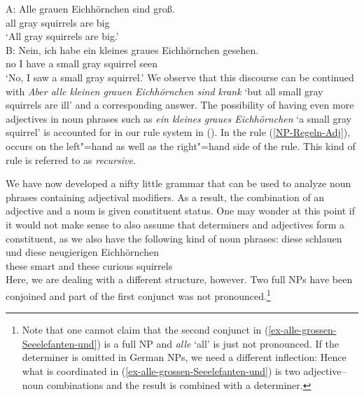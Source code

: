 \ea
\label{Beispiel-Iteration-Adjektive}
\gll A: Alle grauen Eichhörnchen sind groß.\\
\spacebr{} all gray squirrels are big\\
\glt \hphantom{A:~}`All gray squirrels are big.'\\
\gll B: Nein, ich habe ein kleines graues Eichhörnchen gesehen.\\
	\spacebr{} no I have a small gray squirrel seen\\
\glt \hphantom{B:~}`No, I saw a small gray squirrel.'
\z
We observe that this discourse can be continued with \emph{Aber alle kleinen grauen Eichhörnchen
  sind krank} `but all small gray squirrels are ill' and a corresponding answer. The possibility
  of having even more adjectives in noun phrases such as \emph{ein kleines graues Eichhörnchen} `a
  small gray squirrel' is accounted for in our rule system in (). In the rule
  (\ref{NP-Regeln-Adj}), \nbar occurs on the left"=hand as well as the right"=hand 
  side of the rule. This kind of rule is referred to as \emph{recursive}.

\largerpage
We have now developed a nifty little grammar that can be used to analyze noun phrases containing
adjectival modifiers. As a result, the combination of an adjective and a noun is given constituent
status. One may wonder at this point if it would not make sense to also assume that determiners and
adjectives form a constituent, as we also have the following kind of noun phrases: 
\ea
\gll diese schlauen und diese neugierigen Eichhörnchen\\
     these smart    and these curious     squirrels\\
\z
Here, we are dealing with a different structure, however. Two full NPs have been
conjoined and part of the first conjunct was not pronounced.\footnote{
  Note that one cannot claim that the second conjunct in (\ref{ex-alle-grossen-Seeelefanten-und}) is
  a full NP and \emph{alle} `all' is just not pronounced. If the determiner is omitted in German
  NPs, we need a different inflection:
\eal
{}
\zl
Hence what is coordinated in (\ref{ex-alle-grossen-Seeelefanten-und}) is two adjective--noun
combinations and the result is combined with a determiner.
}

